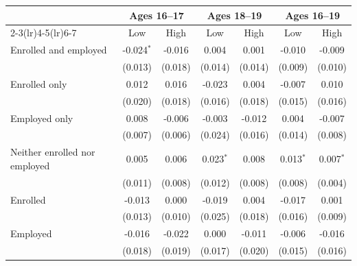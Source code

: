 \begin{tabular}{lcccccc}
\toprule
 & \multicolumn{2}{c}{Ages 16--17} & \multicolumn{2}{c}{Ages 18--19} & \multicolumn{2}{c}{Ages 16--19} \\
\cmidrule(lr){2-3}\cmidrule(lr){4-5}\cmidrule(lr){6-7}
 & Low & High & Low & High & Low & High \\
\midrule
Enrolled and employed & -0.024$^{*}$ & -0.016 & 0.004 & 0.001 & -0.010 & -0.009 \\
 & (0.013) & (0.018) & (0.014) & (0.014) & (0.009) & (0.010) \\
Enrolled only & 0.012 & 0.016 & -0.023 & 0.004 & -0.007 & 0.010 \\
 & (0.020) & (0.018) & (0.016) & (0.018) & (0.015) & (0.016) \\
Employed only & 0.008 & -0.006 & -0.003 & -0.012 & 0.004 & -0.007 \\
 & (0.007) & (0.006) & (0.024) & (0.016) & (0.014) & (0.008) \\
Neither enrolled nor employed & 0.005 & 0.006 & 0.023$^{*}$ & 0.008 & 0.013$^{*}$ & 0.007$^{*}$ \\
 & (0.011) & (0.008) & (0.012) & (0.008) & (0.008) & (0.004) \\
Enrolled & -0.013 & 0.000 & -0.019 & 0.004 & -0.017 & 0.001 \\
 & (0.013) & (0.010) & (0.025) & (0.018) & (0.016) & (0.009) \\
Employed & -0.016 & -0.022 & 0.000 & -0.011 & -0.006 & -0.016 \\
 & (0.018) & (0.019) & (0.017) & (0.020) & (0.015) & (0.016) \\
\bottomrule
\end{tabular}
